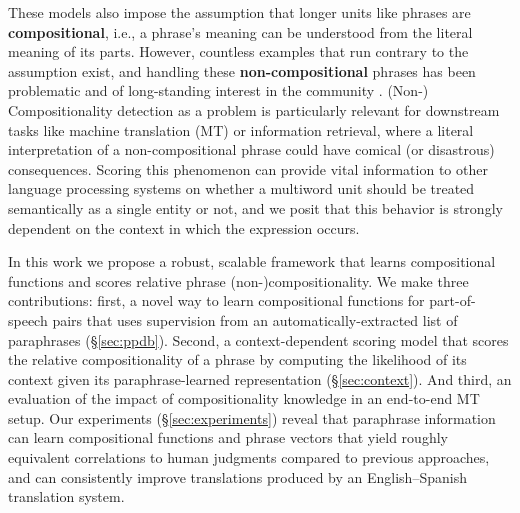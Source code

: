 \documentclass[11pt,letterpaper]{article}
\newcommand{\ensuretext}[1]{#1}
\newcommand{\clabcomment}[3]{\ensuretext{\textcolor{#3}{[#1 #2]}}}
\newcommand{\cjdmarker}{\ensuretext{\textcolor{green}{\ensuremath{^{\textsc{cj}}_{\textsc{d}}}}}}
\newcommand{\cjd}[1]{\clabcomment{\cjdmarker}{#1}{green}}
\begin{document}
These models also impose the assumption that longer units like phrases are \textbf{compositional}, i.e., a phrase's meaning can be understood from the literal meaning of its parts. 
However, countless examples that run contrary to the assumption exist, and handling these \textbf{non-compositional} phrases has been problematic and of long-standing interest in the community \cite{Lin1999,Sag2002}.
(Non-) Compositionality detection as a problem is particularly relevant for downstream tasks like machine translation (MT) or information retrieval, where a literal interpretation of a non-compositional phrase could have comical (or disastrous) consequences. 
Scoring this phenomenon can provide vital information to other language processing systems on whether a multiword unit should be treated semantically as a single entity or not, and we posit that this behavior is strongly dependent on the context in which the expression occurs. 


In this work we propose a robust, scalable framework that learns compositional functions and scores relative phrase (non-)compositionality.
We make three contributions: first, a novel way to learn compositional functions for part-of-speech pairs that uses supervision from an automatically-extracted list of paraphrases (\S\ref{sec:ppdb}). 
Second, a context-dependent scoring model that scores the relative compositionality of a phrase \cite{McCarthy2003} by computing the likelihood of its context given its paraphrase-learned representation (\S\ref{sec:context}). 
And third, an evaluation of the impact of compositionality knowledge in an end-to-end MT setup.
Our experiments (\S\ref{sec:experiments}) reveal that paraphrase information can learn compositional functions and phrase vectors that yield roughly equivalent correlations to human judgments compared to previous approaches, and can consistently improve translations produced by an English--Spanish translation system.
\end{document}
